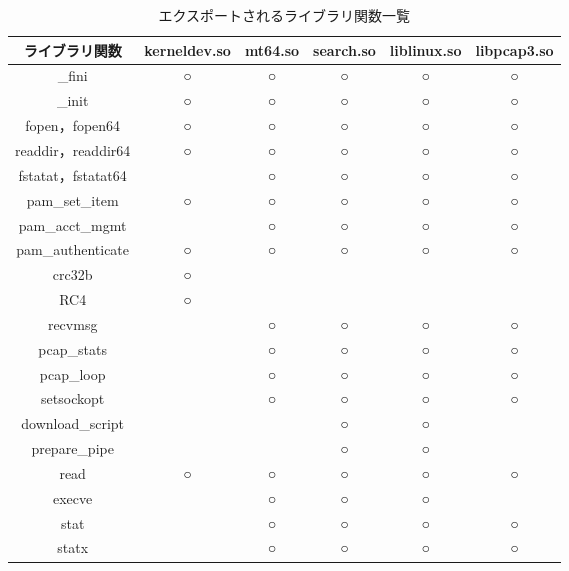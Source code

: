 \documentclass[submit,techreq,noauthor]{eco}	%
\begin{document}
\begin{table*}[t]
  \caption{エクスポートされるライブラリ関数一覧}
  \label{table: library}
  \centering
  \begin{tabular}{|c|c|c|c|c|c|}
  \hline
  ライブラリ関数           & kerneldev.so & mt64.so & search.so & liblinux.so & libpcap3.so \\ \hline
  \_fini            & ○            & ○       & ○         & ○           & ○           \\ \hline
  \_init            & ○            & ○       & ○         & ○           & ○           \\ \hline
  fopen，fopen64     & ○            & ○       & ○         & ○           & ○           \\ \hline
  readdir，readdir64 & ○            & ○       & ○         & ○           & ○           \\ \hline
  fstatat，fstatat64 &              & ○       & ○         & ○           & ○           \\ \hline
  pam\_set\_item    & ○            & ○       & ○         & ○           & ○           \\ \hline
  pam\_acct\_mgmt   &              & ○       & ○         & ○           & ○           \\ \hline
  pam\_authenticate & ○            & ○       & ○         & ○           & ○           \\ \hline
  crc32b            & ○            &         &           &             &             \\ \hline
  RC4               & ○            &         &           &             &             \\ \hline
  recvmsg           &              & ○       & ○         & ○           & ○           \\ \hline
  pcap\_stats       &              & ○       & ○         & ○           & ○           \\ \hline
  pcap\_loop        &              & ○       & ○         & ○           & ○           \\ \hline
  setsockopt        &              & ○       & ○         & ○           & ○           \\ \hline
  download\_script  &              &         & ○         & ○           &             \\ \hline
  prepare\_pipe     &              &         & ○         & ○           &             \\ \hline
  read              & ○            & ○       & ○         & ○           & ○           \\ \hline
  execve            &              & ○       & ○         & ○           &             \\ \hline
  stat              &              & ○       & ○         & ○           & ○           \\ \hline
  statx             &              & ○       & ○         & ○           & ○           \\ \hline
  \end{tabular}
  \end{table*}
\end{document}
